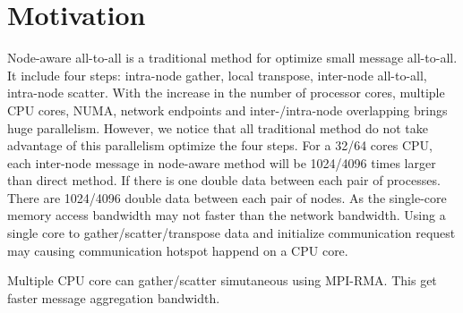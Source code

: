 \section {Motivation}
Node-aware all-to-all is a traditional method for optimize small message all-to-all.
It include four steps: intra-node gather, local transpose, inter-node all-to-all, intra-node scatter.
With the increase in the number of processor cores, multiple CPU cores, NUMA, network endpoints and inter-/intra-node overlapping brings huge parallelism.
However, we notice that all traditional method do not take advantage of this parallelism optimize the four steps.
For a 32/64 cores CPU, each inter-node message in node-aware method will be 1024/4096 times larger than direct method.
If there is one double data between each pair of processes. There are 1024/4096 double data between each pair of nodes.
As the single-core memory access bandwidth may not faster than the network bandwidth.
Using a single core to gather/scatter/transpose data and initialize communication request may causing communication hotspot happend on a CPU core.

Multiple CPU core can gather/scatter simutaneous using  MPI-RMA. This get faster message aggregation bandwidth.